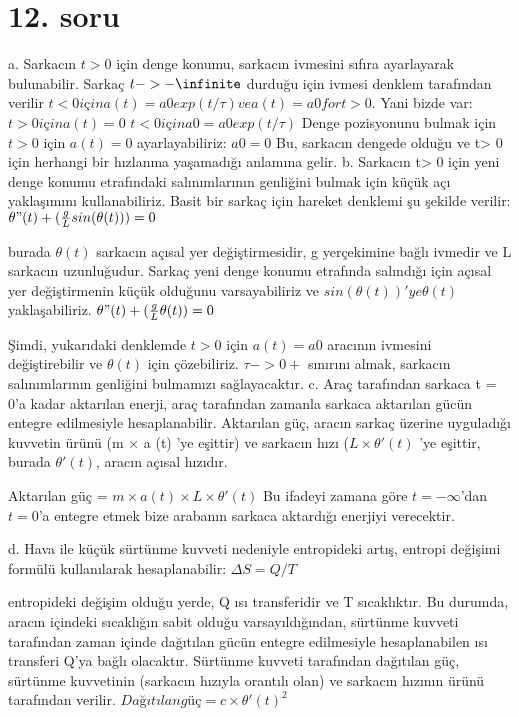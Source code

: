 \documentclass[12pt]{article}
\begin{document}
\section{12. soru}
a. Sarkacın $t>0$ için denge konumu, sarkacın ivmesini sıfıra ayarlayarak bulunabilir. Sarkaç $t -> -\infinite$ durduğu için ivmesi denklem tarafından verilir
$t <0 için a (t) = a0 exp (t / \tau) ve a (t) = a0 fort > 0.$
Yani bizde var:
$t> 0 için a (t) = 0$
$t <0 için a0 = a0 exp (t / \tau)$
Denge pozisyonunu bulmak için $t> 0$ için $a(t) = 0$ ayarlayabiliriz:
$a0 = 0$
Bu, sarkacın dengede olduğu ve t> 0 için herhangi bir hızlanma yaşamadığı anlamına gelir.
\bigbreak
b. Sarkacın t> 0 için yeni denge konumu etrafındaki salınımlarının genliğini bulmak için küçük açı yaklaşımını kullanabiliriz. Basit bir sarkaç için hareket denklemi şu şekilde verilir:
\bigbreak
$\theta"(t)+(\frac{g}{L}sin(\theta(t)))=0$

burada  $\theta(t)$ sarkacın açısal yer değiştirmesidir, g yerçekimine bağlı ivmedir ve L sarkacın uzunluğudur. Sarkaç yeni denge konumu etrafında salındığı için açısal yer değiştirmenin küçük olduğunu varsayabiliriz ve $sin(\theta(t)) 'ye  \theta(t)$ yaklaşabiliriz.
\bigbreak
$\theta"(t)+(\frac{g}{L}\theta(t))=0$

Şimdi, yukarıdaki denklemde $t> 0$ için $a(t)=a0$ aracının ivmesini değiştirebilir ve $\theta(t)$ için çözebiliriz. $\tau -> 0+$ sınırını almak, sarkacın salınımlarının genliğini bulmamızı sağlayacaktır.
\bigbreak
c. Araç tarafından sarkaca t = 0'a kadar aktarılan enerji, araç tarafından zamanla sarkaca aktarılan gücün entegre edilmesiyle hesaplanabilir. Aktarılan güç, aracın sarkaç üzerine uyguladığı kuvvetin ürünü (m × a (t) 'ye eşittir) ve sarkacın hızı ($L × \theta'(t)$ 'ye eşittir, burada $\theta'(t)$, aracın açısal hızıdır. 

Aktarılan güç = $m × a(t) × L × \theta'(t)$
Bu ifadeyi zamana göre $t = -\infty$'dan $t = 0$'a entegre etmek bize arabanın sarkaca aktardığı enerjiyi verecektir.

d. Hava ile küçük sürtünme kuvveti nedeniyle entropideki artış, entropi değişimi formülü kullanılarak hesaplanabilir:
\bigbreak
$\Delta S = Q / T$

entropideki değişim olduğu yerde, Q ısı transferidir ve T sıcaklıktır. Bu durumda, aracın içindeki sıcaklığın sabit olduğu varsayıldığından, sürtünme kuvveti tarafından zaman içinde dağıtılan gücün entegre edilmesiyle hesaplanabilen ısı transferi Q'ya bağlı olacaktır. Sürtünme kuvveti tarafından dağıtılan güç, sürtünme kuvvetinin (sarkacın hızıyla orantılı olan) ve sarkacın hızının ürünü tarafından verilir. 
\bigbreak
$Dağıtılan güç = c \times \theta'(t)^2$
\end{document}
